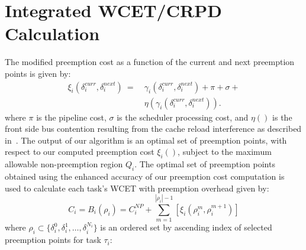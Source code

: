 \section{Integrated WCET/CRPD Calculation}\label{sec:schedulability_analysis}

The modified preemption cost as a function of the current and next preemption points is given by:
\begin{equation}\label{eqn:prempt-cost}
\begin{split}
    \xi_{i}(\delta_{i}^{curr},\delta_{i}^{next})\ =\ &\gamma_{i}(\delta_{i}^{curr},\delta_{i}^{next}) + \pi + \sigma + \\ &\eta(\gamma_{i}(\delta_{i}^{curr},\delta_{i}^{next})).
\end{split}
\end{equation}
%
 \noindent
 where \begin{math}\pi\end{math} is the pipeline cost, \begin{math}\sigma\end{math} is the scheduler processing cost, and \begin{math}\eta()\end{math} is the front side bus contention resulting from the cache reload interference as described in~\cite{pellizzoni:07,pellizzoni:08,pellizzoni:11}.
%
The output of our algorithm is an optimal set of preemption points, with respect to our computed preemption cost $\xi_i()$, subject to the maximum allowable non-preemption region \begin{math}Q_{i}\end{math}.  The optimal set of preemption points obtained using the enhanced accuracy of our preemption cost computation is used to calculate each task's WCET with preemption overhead given by:
\begin{equation}\label{eqn:wcet-cost}
   C_{i} = B_{i}(\rho_{i}) = C_{i}^{NP} + \sum_{m=1}^{|\rho_{i}|-1} [\xi_{i}(\rho_{i}^{m},\rho_{i}^{m+1})]
\end{equation}
\noindent
where $\rho_i \subset \{\delta_i^0, \delta_i^1,  \ldots, \delta_i^{N_i}\}$ is an ordered set by ascending index of selected preemption points for task \begin{math}\tau_{i}\end{math}:
